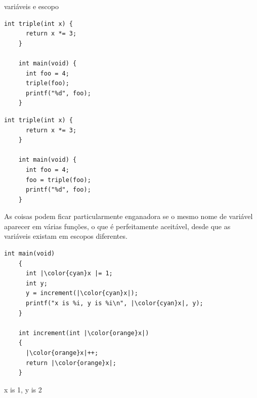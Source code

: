 \documentclass{beamer}
\begin{document}
\begin{frame}{variáveis e escopo}
  \begin{lstlisting}[style=ssc]
    int triple(int x) {
      return x *= 3;
    }
    
    int main(void) {
      int foo = 4;
      triple(foo);
      printf("%d", foo);
    }
  \end{lstlisting}

  \begin{lstlisting}[style=ssc]
    int triple(int x) {
      return x *= 3;
    }
    
    int main(void) {
      int foo = 4;
      foo = triple(foo);
      printf("%d", foo);
    }
  \end{lstlisting}

  \framebreak

  As coisas podem ficar particularmente enganadora se o mesmo nome de
  variável aparecer em várias funções, o que é perfeitamente
  aceitável, desde que as variáveis existam em escopos diferentes.

  \framebreak

  \begin{lstlisting}[style=normalc,escapechar={|}]
    int main(void)
    {
      int |\color{cyan}x |= 1;
      int y;
      y = increment(|\color{cyan}x|);
      printf("x is %i, y is %i\n", |\color{cyan}x|, y);
    }
    
    int increment(int |\color{orange}x|)
    {
      |\color{orange}x|++;
      return |\color{orange}x|;
    }
  \end{lstlisting}

  {\centering x is 1, y is 2}
  
\end{frame}
\end{document}
